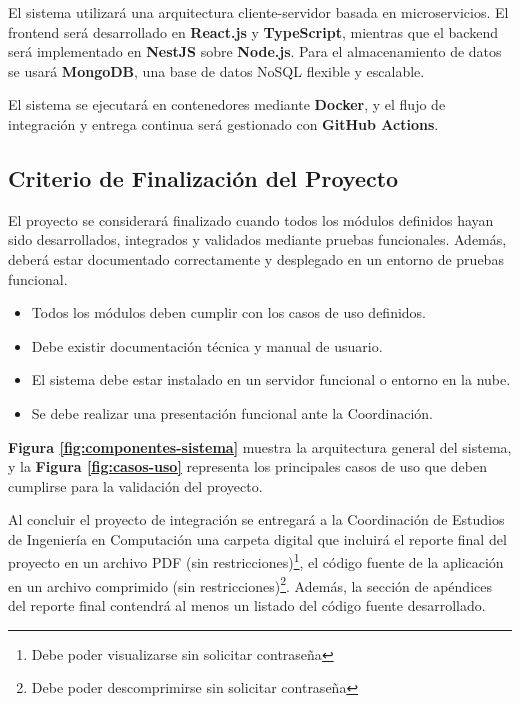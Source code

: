 El sistema utilizará una arquitectura cliente-servidor basada en microservicios. El frontend será desarrollado en \textbf{React.js} y \textbf{TypeScript}, mientras que el backend será implementado en \textbf{NestJS} sobre \textbf{Node.js}. Para el almacenamiento de datos se usará \textbf{MongoDB}, una base de datos NoSQL flexible y escalable.

El sistema se ejecutará en contenedores mediante \textbf{Docker}, y el flujo de integración y entrega continua será gestionado con \textbf{GitHub Actions}.

\subsection{Criterio de Finalización del Proyecto}

El proyecto se considerará finalizado cuando todos los módulos definidos hayan sido desarrollados, integrados y validados mediante pruebas funcionales. Además, deberá estar documentado correctamente y desplegado en un entorno de pruebas funcional.

\begin{itemize}
	\item Todos los módulos deben cumplir con los casos de uso definidos.
	\item Debe existir documentación técnica y manual de usuario.
	\item El sistema debe estar instalado en un servidor funcional o entorno en la nube.
	\item Se debe realizar una presentación funcional ante la Coordinación.
\end{itemize}

\textbf{Figura \ref{fig:componentes-sistema}} muestra la arquitectura general del sistema, y la \textbf{Figura \ref{fig:casos-uso}} representa los principales casos de uso que deben cumplirse para la validación del proyecto.

\vspace{0.5cm}

Al concluir el proyecto de integración se entregará a la Coordinación de Estudios de Ingeniería en Computación una carpeta digital que incluirá el reporte final del proyecto en un archivo PDF (sin restricciones)\footnote{Debe poder visualizarse sin solicitar contraseña}, el código fuente de la aplicación en un archivo comprimido (sin restricciones)\footnote{Debe poder descomprimirse sin solicitar contraseña}. Además, la sección de apéndices del reporte final contendrá al menos un listado del código fuente desarrollado.

